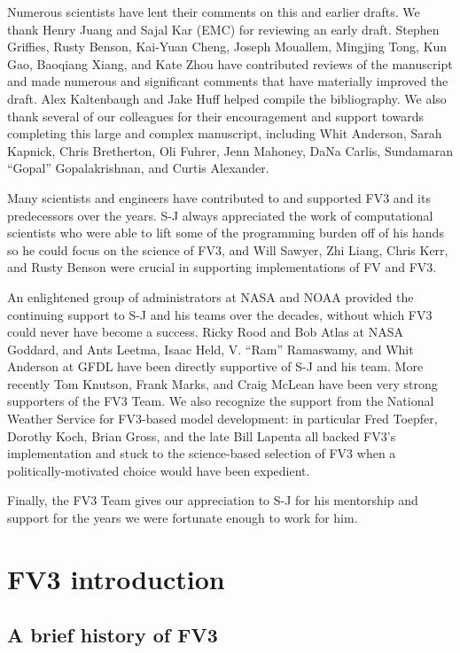 \documentclass[10pt,letterpaper,margin=1in]{memoir}
\begin{document}
Numerous scientists have lent their comments on this and earlier drafts. We thank Henry Juang and Sajal Kar (EMC) for reviewing an early draft. Stephen Griffies, Rusty Benson, Kai-Yuan Cheng, Joseph Mouallem, Mingjing Tong, Kun Gao, Baoqiang Xiang, and Kate Zhou have contributed reviews of the manuscript and made numerous and significant comments that have materially improved the draft. Alex Kaltenbaugh and Jake Huff helped compile the bibliography. 
We also thank several of our colleagues for their encouragement and support towards completing this large and complex manuscript, including Whit Anderson, Sarah Kapnick, Chris Bretherton, Oli Fuhrer, Jenn Mahoney, DaNa Carlis, Sundamaran ``Gopal'' Gopalakrishnan, and Curtis Alexander.

Many scientists and engineers have contributed to and supported FV3 and its predecessors over the years. S-J always appreciated the work of computational scientists who were able to lift some of the programming burden off of his hands so he could focus on the science of FV3, and Will Sawyer, Zhi Liang, Chris Kerr, and Rusty Benson were crucial in supporting implementations of FV and FV3. 


An enlightened group of administrators at NASA and NOAA provided the continuing support to S-J and his teams over the decades, without which FV3 could never have become a success. Ricky Rood and Bob Atlas at NASA Goddard, and Ants Leetma, Isaac Held, V. ``Ram'' Ramaswamy, and Whit Anderson at GFDL have been directly supportive of S-J and his team.  More recently Tom Knutson, Frank Marks, and Craig McLean have been very strong supporters of the FV3 Team. We also recognize the support from the National Weather Service for FV3-based model development: in particular Fred Toepfer, Dorothy Koch, Brian Gross, and the late Bill Lapenta all backed FV3's implementation and stuck to the science-based selection of FV3 when a politically-motivated choice would have been expedient. 

Finally, the FV3 Team gives our appreciation to S-J for his mentorship and support for the years we were fortunate enough to work for him. 



\chapter{FV3 introduction}\label{chap:intro}

\section{A brief history of FV3}
\end{document}
